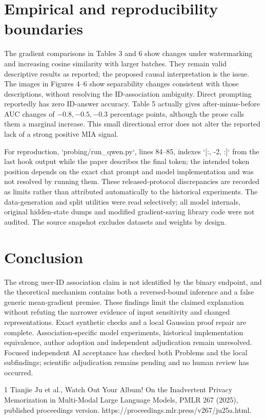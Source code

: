 \documentclass[10pt]{article}
\begin{document}
\section*{Empirical and reproducibility boundaries}
The gradient comparisons in Tables 3 and 6 show changes under watermarking and increasing cosine similarity with larger batches. They remain valid descriptive results as reported; the proposed causal interpretation is the issue. The images in Figures 4–6 show separability changes consistent with those descriptions, without resolving the ID-association ambiguity. Direct prompting reportedly has zero ID-answer accuracy. Table 5 actually gives after-minus-before AUC changes of \(-0.8,-0.5,-0.3\) percentage points, although the prose calls them a marginal increase. This small directional error does not alter the reported lack of a strong positive MIA signal.\par
For reproduction, `probing/run\_qwen.py`, lines 84–85, indexes `[:, -2, :]` from the last hook output while the paper describes the final token; the intended token position depends on the exact chat prompt and model implementation and was not resolved by running them. These released-protocol discrepancies are recorded as limits rather than attributed automatically to the historical experiments. The data-generation and split utilities were read selectively; all model internals, original hidden-state dumps and modified gradient-saving library code were not audited. The source snapshot excludes datasets and weights by design.\par
\section*{Conclusion}
The strong user-ID association claim is not identified by the binary endpoint, and the theoretical mechanism contains both a reversed-bound inference and a false generic mean-gradient premise. These findings limit the claimed explanation without refuting the narrower evidence of input sensitivity and changed representations. Exact synthetic checks and a local Gaussian proof repair are complete. Association-specific model experiments, historical implementation equivalence, author adoption and independent adjudication remain unresolved. Focused independent AI acceptance has checked both Problems and the local subfindings; scientific adjudication remains pending and no human review has occurred.\par
1 Tianjie Ju et al., Watch Out Your Album! On the Inadvertent Privacy Memorization in Multi-Modal Large Language Models, PMLR 267 (2025), published proceedings version. https://proceedings.mlr.press/v267/ju25a.html.\par
\end{document}
